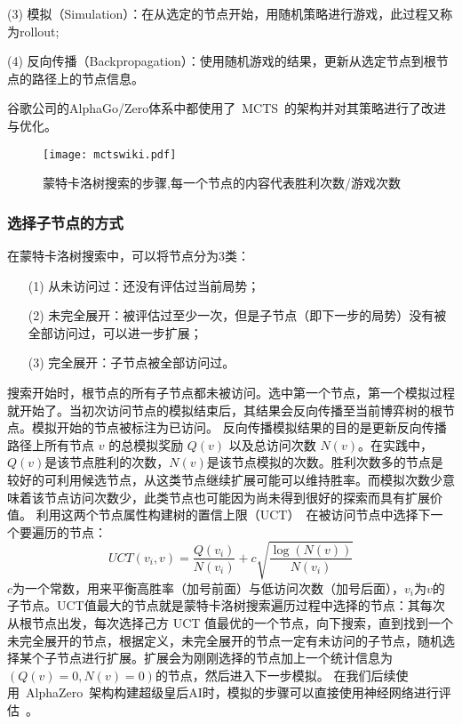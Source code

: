 (3) 模拟（Simulation）：在从选定的节点开始，用随机策略进行游戏，此过程又称为rollout;

(4) 反向传播（Backpropagation）：使用随机游戏的结果，更新从选定节点到根节点的路径上的节点信息。

谷歌公司的AlphaGo/Zero体系中都使用了~MCTS~的架构并对其策略进行了改进与优化。

\begin{figure}[htb]
    \centering
    \texttt{[image: mctswiki.pdf]}
    \caption[mcts]{%
    蒙特卡洛树搜索的步骤,每一个节点的内容代表胜利次数/游戏次数~\cite{RePEc:wsi:nmncxx:v:04:y:2008:i:03:n:s1793005708001094}%
      }
    \label{fig:mcts}
\end{figure}

\subsubsection{选择子节点的方式}
在蒙特卡洛树搜索中，可以将节点分为3类：

\begin{itemize}
    \item [(1)] 
    从未访问过：还没有评估过当前局势；
    \item [(2)]
    未完全展开：被评估过至少一次，但是子节点（即下一步的局势）没有被全部访问过，可以进一步扩展；
    \item [(3)]
    完全展开：子节点被全部访问过。
\end{itemize}

搜索开始时，根节点的所有子节点都未被访问。选中第一个节点，第一个模拟过程就开始了。当初次访问节点的模拟结束后，其结果会反向传播至当前博弈树的根节点。模拟开始的节点被标注为已访问。
反向传播模拟结果的目的是更新反向传播路径上所有节点 $v$ 的总模拟奖励 $Q(v)$ 以及总访问次数 $N(v)$。在实践中，$Q(v)$是该节点胜利的次数，$N(v)$是该节点模拟的次数。胜利次数多的节点是较好的可利用候选节点，从这类节点继续扩展可能可以维持胜率。而模拟次数少意味着该节点访问次数少，此类节点也可能因为尚未得到很好的探索而具有扩展价值。
利用这两个节点属性构建树的置信上限（UCT）~\cite{10.1007/11871842_29}在被访问节点中选择下一个要遍历的节点：
\begin{equation*}
    UCT(v_{i},v) = \frac{Q(v_{i})}{N(v_{i})} + c\sqrt{\frac{\log(N(v))}{N(v_{i})}}
\end{equation*}
$c$为一个常数，用来平衡高胜率（加号前面）与低访问次数（加号后面），$v_{i}$为$v$的子节点。UCT值最大的节点就是蒙特卡洛树搜索遍历过程中选择的节点：其每次从根节点出发，每次选择己方 UCT 值最优的一个节点，向下搜索，直到找到一个未完全展开的节点，根据定义，未完全展开的节点一定有未访问的子节点，随机选择某个子节点进行扩展。扩展会为刚刚选择的节点加上一个统计信息为$(Q(v)=0,N(v)=0)$的节点，然后进入下一步模拟。
在我们后续使用~AlphaZero~架构构建超级皇后AI时，模拟的步骤可以直接使用神经网络进行评估~\cite{Silver1140,Silver2017,Silver2016}。


